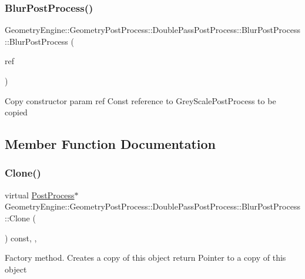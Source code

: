 \subsubsection{\texorpdfstring{BlurPostProcess()}{BlurPostProcess()}\hspace{0.1cm}{\footnotesize\ttfamily [2/2]}}
{\footnotesize\ttfamily Geometry\+Engine\+::\+Geometry\+Post\+Process\+::\+Double\+Pass\+Post\+Process\+::\+Blur\+Post\+Process\+::\+Blur\+Post\+Process (\begin{DoxyParamCaption}\item[{const \mbox{\hyperlink{class_geometry_engine_1_1_geometry_post_process_1_1_double_pass_post_process_1_1_blur_post_process}{Blur\+Post\+Process}} \&}]{ref }\end{DoxyParamCaption})}

Copy constructor param ref Const reference to Grey\+Scale\+Post\+Process to be copied 

\subsection{Member Function Documentation}
\mbox{\label{class_geometry_engine_1_1_geometry_post_process_1_1_double_pass_post_process_1_1_blur_post_process_a4399f435326724c64cf255a40479d330}} 
\subsubsection{\texorpdfstring{Clone()}{Clone()}}
{\footnotesize\ttfamily virtual \mbox{\hyperlink{class_geometry_engine_1_1_geometry_post_process_1_1_post_process}{Post\+Process}}$\ast$ Geometry\+Engine\+::\+Geometry\+Post\+Process\+::\+Double\+Pass\+Post\+Process\+::\+Blur\+Post\+Process\+::\+Clone (\begin{DoxyParamCaption}{ }\end{DoxyParamCaption}) const\hspace{0.3cm}{\ttfamily [inline]}, {\ttfamily [override]}, {\ttfamily [virtual]}}

Factory method. Creates a copy of this object return Pointer to a copy of this object 

